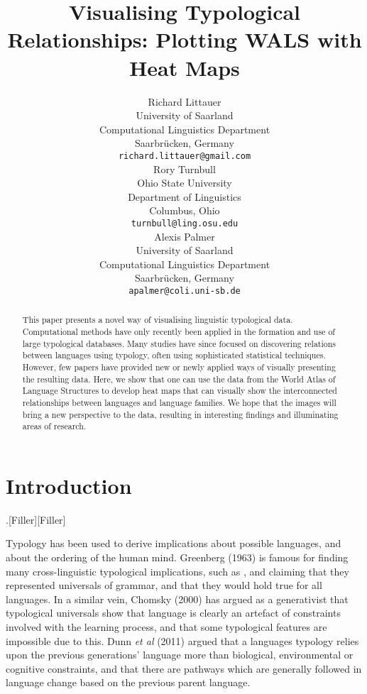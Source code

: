 \documentclass[11pt]{article}
\title{Visualising Typological Relationships: Plotting WALS with Heat Maps}
\author{Richard Littauer \\
University of Saarland\\
Computational Linguistics Department\\
Saarbr\"ucken, Germany\\
  {\tt richard.littauer@gmail.com} \\\And
Rory Turnbull \\
Ohio State University\\
Department of Linguistics\\
Columbus, Ohio\\
  {\tt turnbull@ling.osu.edu} \\\AND
Alexis Palmer\\
University of Saarland\\
Computational Linguistics Department\\
Saarbr\"ucken, Germany\\
  {\tt apalmer@coli.uni-sb.de}\\}
\date{}
\begin{document}
\maketitle
\begin{abstract}
This paper presents a novel way of visualising linguistic typological data. Computational methods have only recently been applied in the formation and use of large typological databases. Many studies have since focused on discovering relations between languages using typology, often using sophisticated statistical techniques. However, few papers have provided new or newly applied ways of visually presenting the resulting data. Here, we show that one can use the data from the World Atlas of Language Structures \cite{wals-2011} to develop heat maps that can visually show the interconnected relationships between languages and language families. We hope that the images will bring a new perspective to the data, resulting in interesting findings and illuminating areas of research.
\end{abstract}


\section{Introduction}
.[Filler][Filler]

Typology has been used to derive implications about possible languages, and about the ordering of the human mind. Greenberg (1963) \nocite{greenberg} is famous for finding many cross-linguistic typological implications, such as %
, and claiming that they represented universals of grammar, and that they would hold true for all languages. In a similar vein, Chomsky (2000) \nocite{chomsky}%
has argued as a generativist that typological universals show that language is clearly an artefact of constraints involved with the learning process, and that some typological features are impossible due to this. Dunn {\it et al} (2011) %
argued that a languages typology relies upon the previous generations' language more than biological, environmental or cognitive constraints, and that there are pathways which are generally followed in language change based on the previous parent language. 
\end{document}
